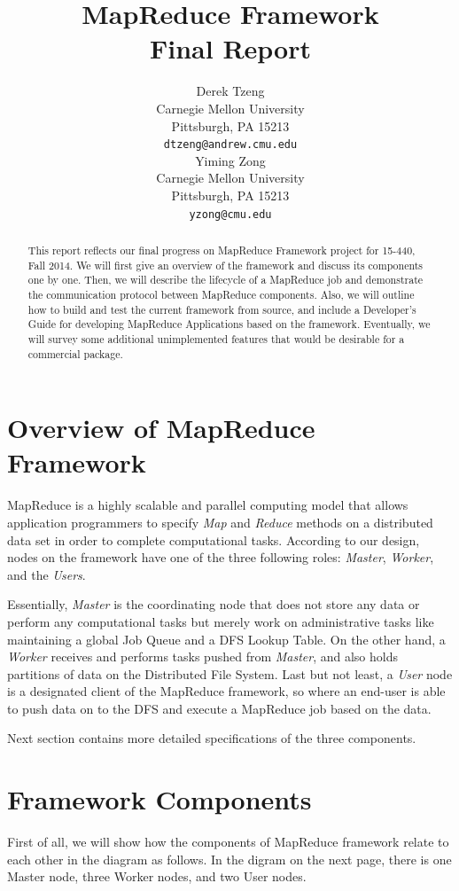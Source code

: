 \documentclass{article} %
\title{MapReduce Framework\\Final Report}
\author{
Derek Tzeng\\
Carnegie Mellon University\\
Pittsburgh, PA 15213 \\
\texttt{dtzeng@andrew.cmu.edu} \\
\And
Yiming Zong\\
Carnegie Mellon University\\
Pittsburgh, PA 15213 \\
\texttt{yzong@cmu.edu} \\
}
\begin{document}
\maketitle

\begin{abstract}
This report reflects our final progress on MapReduce Framework project for 15-440, Fall 2014. We will first give an overview of the framework and discuss its components one by one. Then, we will describe the lifecycle of a MapReduce job and demonstrate the communication protocol between MapReduce components. Also, we will outline how to build and test the current framework from source, and include a Developer's Guide for developing MapReduce Applications based on the framework. Eventually, we will survey some additional unimplemented features that would be desirable for a commercial package.
\end{abstract}

\section{Overview of MapReduce Framework}

\par\qquad MapReduce is a highly scalable and parallel computing model that allows application programmers to specify \emph{Map} and \emph{Reduce} methods on a distributed data set in order to complete computational tasks. According to our design, nodes on the framework have one of the three following roles: \emph{Master}, \emph{Worker}, and the \emph{Users}.
\par\qquad Essentially, \emph{Master} is the coordinating node that does not store any data or perform any computational tasks but merely work on administrative tasks like maintaining a global Job Queue and a DFS Lookup Table. On the other hand, a \emph{Worker} receives and performs tasks pushed from \emph{Master}, and also holds partitions of data on the Distributed File System. Last but not least, a \emph{User} node is a designated client of the MapReduce framework, so where an end-user is able to push data on to the DFS and execute a MapReduce job based on the data.
\par\qquad Next section contains more detailed specifications of the three components.

\section{Framework Components}
\par\qquad First of all, we will show how the components of MapReduce framework relate to each other in the diagram as follows. In the digram on the next page, there is one Master node, three Worker nodes, and two User nodes.
\end{document}
